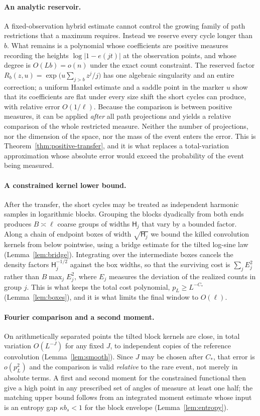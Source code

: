 \documentclass[11pt]{article}
\theoremstyle{definition}\newtheorem{definition}[theorem]{Definition}
\theoremstyle{remark}\newtheorem{remark}[theorem]{Remark}
\numberwithin{equation}{section}\allowdisplaybreaks
\begin{document}
\paragraph{An analytic reservoir.} A fixed-observation hybrid estimate
cannot control the growing family of path restrictions that a maximum
requires. Instead we reserve every cycle longer than $b$. What remains
is a polynomial whose coefficients are positive measures recording the
heights $\log|1-e(jt)|$ at the observation points, and whose degree is
$O(Lb)=o(n)$ under the exact count constraint. The reserved factor
$R_b(z,u)=\exp\bigl(u\sum_{j>b}z^j/j\bigr)$ has one algebraic
singularity and an entire correction; a uniform Hankel estimate and a
saddle point in the marker $u$ show that its coefficients are flat under
every size shift the short cycles can produce, with relative error
$O(1/\ell)$. Because the comparison is between positive measures, it can
be applied \emph{after} all path projections and yields a relative
comparison of the whole restricted measure. Neither the number of
projections, nor the dimension of the space, nor the mass of the event
enters the error. This is Theorem~\ref{thm:positive-transfer}, and it is
what replaces a total-variation approximation whose absolute error would
exceed the probability of the event being measured.

\paragraph{A constrained kernel lower bound.} After the transfer, the
short cycles may be treated as independent harmonic samples in
logarithmic blocks. Grouping the blocks dyadically from both ends
produces $B\asymp\ell$ coarse groups of widths $\mathsf H_j$ that vary
by a bounded factor. Along a chain of endpoint boxes of width
$\sqrt{\mathsf H_j}$ we bound the killed convolution kernels from below
pointwise, using a bridge estimate for the tilted log-sine law
(Lemma~\ref{lem:bridge}). Integrating over the intermediate boxes
cancels the density factors $\mathsf H_j^{-1/2}$ against the box widths,
so that the surviving cost is $\sum_jE_j^2$ rather than
$B\max_jE_j^2$, where $E_j$ measures the deviation of the realized
counts in group $j$. This is what keeps the total cost polynomial,
$p_L\ge L^{-C_*}$ (Lemma~\ref{lem:boxes}), and it is what limits the
final window to $O(\ell)$.

\paragraph{Fourier comparison and a second moment.} On arithmetically
separated points the tilted block kernels are close, in total variation
$O(L^{-J})$ for any fixed $J$, to independent copies of the reference
convolution (Lemma~\ref{lem:smooth}). Since $J$ may be chosen after
$C_*$, that error is $o(p_L^2)$ and the comparison is valid
\emph{relative} to the rare event, not merely in absolute terms. A first
and second moment for the constrained functional then give a high point
in any prescribed set of angles of measure at least one half; the
matching upper bound follows from an integrated moment estimate whose
input is an entropy gap $\kappa b_s<1$ for the block envelope
(Lemma~\ref{lem:entropy}).
\end{document}
